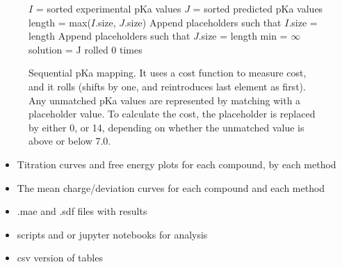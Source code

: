 \documentclass[9pt,lineno,final]{elife}
\begin{document}
\begin{figure}
	\begin{algorithm}[H]
		\SetAlgoLined
		\caption{Sequential pKa mapping. It uses a cost function to measure cost, and it rolls (shifts by one, and reintroduces last element as first). Any unmatched pKa values are represented by matching with a placeholder value. To calculate the cost, the placeholder is replaced by either 0, or 14, depending on whether the unmatched value is above or below 7.0.}
		\label{alg:sequential}
		 
		$I$ = sorted experimental pKa values \;
		$J$ = sorted predicted pKa values \;
		length = max($I$.size, $J$.size)\;
		Append placeholders such that $I$.size = length \;
		Append placeholders such that $J$.size = length \;
		min = $\infty$\;
		solution = J rolled 0 times\;
	\end{algorithm}
\end{figure}

\begin{itemize}
	\item Titration curves and free energy plots for each compound, by each method
	\item The mean charge/deviation curves for each compound and each method
	\item .mae and .sdf files with results
	\item scripts and or jupyter notebooks for analysis
	\item csv version of tables
\end{itemize}
\end{document}
